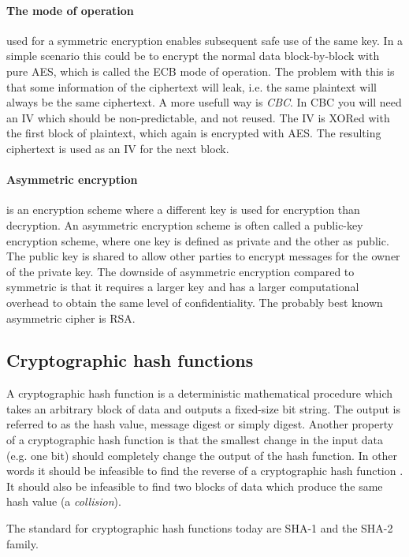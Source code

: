 \documentclass[pdftex,english,10pt,b5paper,twoside]{book}
\begin{document}
\paragraph{The mode of operation} used for a symmetric encryption enables
subsequent safe use of the same key. In a simple scenario this could be to
encrypt the normal data block-by-block with pure \ac{AES}, which is called the
\ac{ECB} mode of operation. The problem with this is that some information of
the ciphertext will leak, i.e. the same plaintext will always be the same
ciphertext. A more usefull way is \emph{\ac{CBC}}. In \ac{CBC} you will need an
\ac{IV} which should be non-predictable, and not reused. The \ac{IV} is XORed
with the first block of plaintext, which again is encrypted with \ac{AES}. The
resulting ciphertext is used as an \ac{IV} for the next block\cite[p. 183]{stallings}.

\paragraph{Asymmetric encryption} is an encryption scheme where a different key
is used for encryption than decryption\cite[p. 259]{stallings}. An asymmetric
encryption scheme is often called a public-key encryption scheme, where one key
is defined as private and the other as public. The public key is shared to
allow other parties to encrypt messages for the owner of the private key. The
downside of asymmetric encryption compared to symmetric is that it requires a
larger key and has a larger computational overhead to obtain the same level of
confidentiality. The probably best known asymmetric cipher is \ac{RSA}.

\subsection{Cryptographic hash functions}
A cryptographic hash function is a deterministic mathematical procedure which
takes an arbitrary block of data and outputs a fixed-size bit string. The output
is referred to as the hash value, message digest or simply digest.
Another property of a cryptographic hash function is that the smallest change in
the input data (e.g. one bit) should completely change the output of the hash
function. In other words it should be infeasible to find the reverse of a
cryptographic hash function \cite[p. 335]{stallings}. It should also be infeasible to
find two blocks of data which produce the same hash value (a \emph{collision}).

The standard for cryptographic hash functions today are \ac{SHA}-1 and the
\ac{SHA}-2 family.
\end{document}
